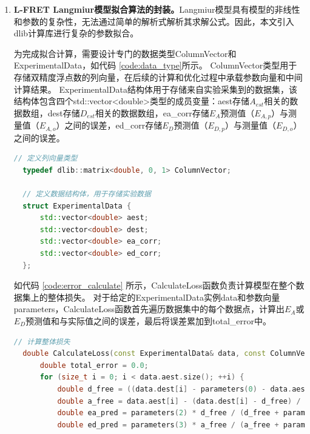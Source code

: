 \begin{enumerate}
  \item \textbf{L-FRET Langmiur模型拟合算法的封装。}Langmiur模型具有模型的非线性和参数的复杂性，无法通过简单的解析式解析其求解公式。因此，本文引入dlib计算库进行复杂的参数拟合。

  为完成拟合计算，需要设计专门的数据类型ColumnVector和ExperimentalData，如代码 \ref{code:data_type}所示。
  ColumnVector类型用于存储双精度浮点数的列向量，在后续的计算和优化过程中承载参数向量和中间计算结果。
  ExperimentalData结构体用于存储来自实验采集到的数据集，该结构体包含四个std::vector<double>类型的成员变量：aest存储$A_{est}$相关的数据数组，dest存储$D_{est}$相关的数据数组，ea\_corr存储$E_A$预测值（$E_{A,p}$）与测量值（$E_{A,o}$）之间的误差，ed\_corr存储$E_D$预测值（$E_{D,p}$）与测量值（$E_{D,o}$）之间的误差。
  \begin{lstlisting}[language=C++, caption={数据类型}, label={code:data_type}]  
  // 定义列向量类型
  typedef dlib::matrix<double, 0, 1> ColumnVector;
  
  // 定义数据结构体，用于存储实验数据
  struct ExperimentalData {
      std::vector<double> aest;
      std::vector<double> dest;
      std::vector<double> ea_corr;
      std::vector<double> ed_corr;
  };
  \end{lstlisting}
  如代码 \ref{code:error_calculate} 所示，CalculateLoss函数负责计算模型在整个数据集上的整体损失。
  对于给定的ExperimentalData实例data和参数向量parameters，CalculateLoss函数首先遍历数据集中的每个数据点，计算出$E_A$或$E_D$预测值和与实际值之间的误差，最后将误差累加到total\_error中。
  \begin{lstlisting}[language=C++, caption={误差计算函数}, label={code:error_calculate}]
  // 计算整体损失
  double CalculateLoss(const ExperimentalData& data, const ColumnVector& parameters) {
      double total_error = 0.0;
      for (size_t i = 0; i < data.aest.size(); ++i) {
          double d_free = ((data.dest[i] - parameters(0) - data.aest[i] * parameters(1)) + std::sqrt(std::pow(data.dest[i] - parameters(0) - data.aest[i] * parameters(1), 2) + 4 * parameters(0) * data.dest[i])) / 2;
          double a_free = data.aest[i] - (data.dest[i] - d_free) / parameters(1);
          double ea_pred = parameters(2) * d_free / (d_free + parameters(0));
          double ed_pred = parameters(3) * a_free / (a_free + parameters(0) / parameters(1));
  

\end{lstlisting}
\end{enumerate}
